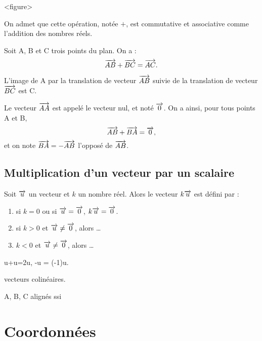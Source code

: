 \documentclass[a4paper,11pt,DIV18,BCOR0mm]{scrartcl}
\begin{document}
<figure>


\begin{remarque}
On admet que cette opération, notée $+$, est commutative et associative
comme l'addition des nombres réels.
\end{remarque}

\begin{theoreme}
Soit A, B et C trois points du plan.
On a :
\[
\overrightarrow{AB}+\overrightarrow{BC}=\overrightarrow{AC}.
\]
\end{theoreme}
\begin{demonstration}
L'image de A par la translation de vecteur $\overrightarrow{AB}$ suivie
de la translation de vecteur $\overrightarrow{BC}$ est C.
\end{demonstration}

\begin{definition}
Le vecteur $\overrightarrow{AA}$ est appelé le vecteur nul, et noté
$\overrightarrow{0}$. On a ainsi, pour tous points A et B,
\[
\overrightarrow{AB}+\overrightarrow{BA}=\overrightarrow{0},
\]
et on note $\overrightarrow{BA}=-\overrightarrow{AB}$ l'opposé de $\overrightarrow{AB}$.
\end{definition}


\subsection{Multiplication d'un vecteur par un scalaire}
\begin{definition}
Soit $\overrightarrow{u}$ un vecteur et $k$ un nombre réel.
Alors le vecteur $k\overrightarrow{u}$ est défini par :
\begin{enumerate}
  \item si $k=0$ ou si $\overrightarrow{u}=\overrightarrow{0}$, $k\overrightarrow{u}=\overrightarrow{0}$.
  \item si $k>0$ et $\overrightarrow{u}\neq\overrightarrow{0}$, alors \dots
  \item $k<0$ et $\overrightarrow{u}\neq\overrightarrow{0}$, alors \dots
\end{enumerate}
\end{definition}

\begin{remarque}
u+u=2u, -u = (-1)u.
\end{remarque}


\begin{definition}
vecteurs colinéaires.
\end{definition}


\begin{theoreme}
A, B, C alignés ssi
\end{theoreme}



\section{Coordonnées}
\end{document}
